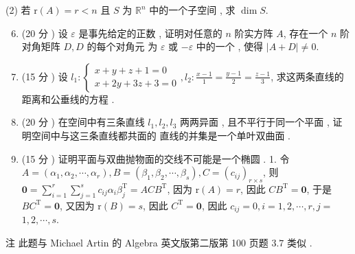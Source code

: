 \documentclass[10pt]{article}
\begin{document}
(2)  若  $\mathrm{r}(A)=r<n$  且  $S$  为  $\mathbb{R}^{n}$  中的一个子空间 ,  求  $\operatorname{dim} S$.

\begin{enumerate}
  \setcounter{enumi}{5}
  \item (20  分 )  设  $\varepsilon$  是事先给定的正数 ,  证明对任意的  $n$  阶实方阵  $A$,  存在一个  $n$  阶对角矩阵  $D, D$  的每个对角元   为  $\varepsilon$  或  $-\varepsilon$  中的一个 ,  使得  $|A+D| \neq 0$.

  \item (15  分 )  设  $l_{1}:\left\{\begin{array}{l}x+y+z+1=0 \\ x+2 y+3 z+3=0\end{array}, l_{2}: \frac{x-1}{1}=\frac{y-1}{2}=\frac{z-1}{3}\right.$,  求这两条直线的距离和公垂线的方程 .

  \item (20  分 )  在空间中有三条直线  $l_{1}, l_{2}, l_{3}$  两两异面 ,  且不平行于同一个平面 ,  证明空间中与这三条直线都共面的   直线的并集是一个单叶双曲面 .

  \item (15  分 )  证明平面与双曲抛物面的交线不可能是一个椭圆 . 1.  令  $A=\left(\alpha_{1}, \alpha_{2}, \cdots, \alpha_{r}\right), B=\left(\beta_{1}, \beta_{2}, \cdots, \beta_{s}\right), C=\left(c_{i j}\right)_{r \times s}$,  则  $\mathbf{0}=\sum_{i=1}^{r} \sum_{j=1}^{s} c_{i j} \alpha_{i} \beta_{j}^{\mathrm{T}}=A C B^{\mathrm{T}}$,  因为  $\mathrm{r}(A)=r$,  因此  $C B^{\mathrm{T}}=\mathbf{0}$,  于是  $B C^{\mathrm{T}}=\mathbf{0}$,  又因为  $\mathrm{r}(B)=s$,  因此  $C^{\mathrm{T}}=\mathbf{0}$,  因此  $c_{i j}=0, i=1,2, \cdots, r, j=$ $1,2, \cdots, s$.

\end{enumerate}
 注   此题与  Michael Artin  的  Algebra  英文版第二版第  100  页题  $3.7$  类似 .
\end{document}
